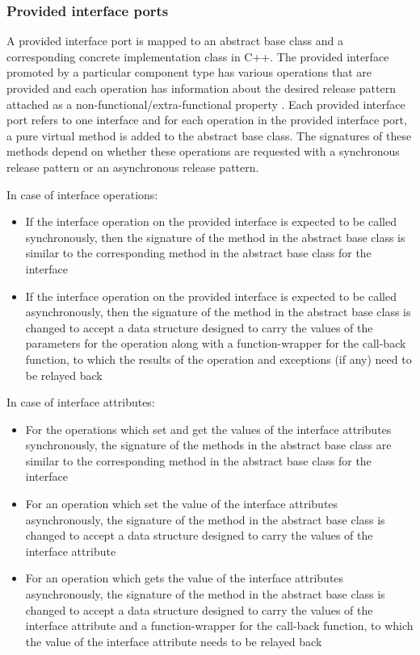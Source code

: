 \subsubsection{\textbf{Provided interface ports}}
A provided interface port is mapped to an abstract base class and a corresponding concrete implementation class in C++. The provided interface promoted by a particular component type has various operations that are provided and each operation has information about the desired release pattern attached as a non-functional/extra-functional property \cite{SpecMetamodel,CompBasedProcess}. Each provided interface port refers to one interface and for each operation in the provided interface port, a pure virtual method is added to the abstract base class. The signatures of these methods depend on whether these operations are requested with a synchronous release pattern or an asynchronous release pattern.

In case of interface operations:
\begin{itemize}
\item If the interface operation on the provided interface is expected to be called synchronously, then the signature of the method in the abstract base class is similar to the corresponding method in the abstract base class for the interface
\item If the interface operation on the provided interface is expected to be called asynchronously, then the signature of the method in the abstract base class is changed to accept a data structure designed to carry the values of the parameters for the operation along with a function-wrapper for the call-back function, to which the results of the operation and exceptions (if any) need to be relayed back     
\end{itemize}   

In case of interface attributes:
\begin{itemize}
\item For the operations which set and get the values of the interface attributes synchronously, the signature of the methods in the abstract base class are similar to the corresponding method in the abstract base class for the interface
\item For an operation which set the value of the interface attributes asynchronously, the signature of the method in the abstract base class is changed to accept a data structure designed to carry the values of the interface attribute
\item For an operation which gets the value of the interface attributes asynchronously, the signature of the method in the abstract base class is changed to accept a data structure designed to carry the values of the interface attribute and a function-wrapper for the call-back function, to which the value of the interface attribute needs to be relayed back 
\end{itemize}

